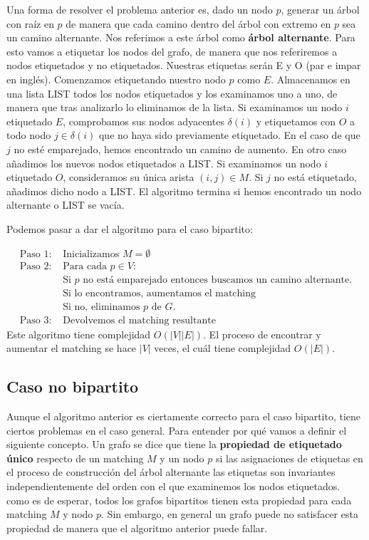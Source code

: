 \documentclass[twoside,12pt]{article}
\begin{document}
Una forma de resolver el problema anterior es, dado un nodo $p$, generar un árbol con raíz en $p$ de manera que cada camino dentro del árbol con extremo en $p$ sea un camino alternante. Nos referimos a este árbol como \textbf{árbol alternante}. Para esto vamos a etiquetar los nodos del grafo, de manera que nos referiremos a nodos etiquetados y no etiquetados. Nuestras etiquetas serán E y O (par e impar en inglés). Comenzamos etiquetando nuestro nodo $p$ como $E$. Almacenamos en una lista LIST todos los nodos etiquetados y los examinamos uno a uno, de manera que tras analizarlo lo eliminamos de la lista. Si examinamos un nodo $i$ etiquetado $E$, comprobamos sus nodos adyacentes $\delta(i)$ y etiquetamos con $O$ a todo nodo $j\in \delta(i)$ que no haya sido previamente etiquetado. En el caso de que $j$ no esté emparejado, hemos encontrado un camino de aumento. En otro caso añadimos los nuevos nodos etiquetados a LIST. Si examinamos un nodo $i$ etiquetado $O$, consideramos su única arista $(i,j) \in M$. Si $j$ no está etiquetado, añadimos dicho nodo a LIST. El algoritmo termina si hemos encontrado un nodo alternante o LIST se vacía. 

Podemos pasar a dar el algoritmo para el caso bipartito:

\begin{align*}
\text{Paso 1: }&\text{Inicializamos $M=\emptyset$}\\
\text{Paso 2: }&\text{Para cada $p \in V$:}\\
&\text{Si $p$ no está emparejado entonces buscamos un camino alternante.}\\
&\text{Si lo encontramos, aumentamos el matching}\\
&\text{Si no, eliminamos $p$ de $G$.}\\
\text{Paso 3: }& \text{Devolvemos el matching resultante}
\end{align*} 
Este algoritmo tiene complejidad $O(|V||E|)$. El proceso de encontrar y aumentar el matching se hace $|V|$ veces, el cuál tiene complejidad $O(|E|)$.
\subsection{Caso no bipartito}
Aunque el algoritmo anterior es ciertamente correcto para el caso bipartito, tiene ciertos problemas en el caso general. Para entender por qué vamos a definir el siguiente concepto. Un grafo se dice que tiene la \textbf{propiedad de etiquetado único} respecto de un matching $M$ y un nodo $p$ si las asignaciones de etiquetas en el proceso de construcción del árbol alternante las etiquetas son invariantes independientemente del orden con el que examinemos los nodos etiquetados. como es de esperar, todos los grafos bipartitos tienen esta propiedad para cada matching $M$ y nodo $p$. Sin embargo, en general un grafo puede no satisfacer esta propiedad de manera que el algoritmo anterior puede fallar. 
\end{document}
